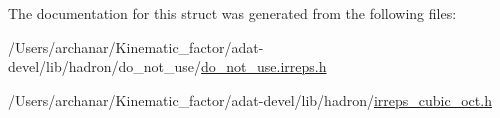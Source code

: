The documentation for this struct was generated from the following files\+:\begin{DoxyCompactItemize}
\item 
/\+Users/archanar/\+Kinematic\+\_\+factor/adat-\/devel/lib/hadron/do\+\_\+not\+\_\+use/\mbox{\hyperlink{adat-devel_2lib_2hadron_2do__not__use_2do__not__use_8irreps_8h}{do\+\_\+not\+\_\+use.\+irreps.\+h}}\item 
/\+Users/archanar/\+Kinematic\+\_\+factor/adat-\/devel/lib/hadron/\mbox{\hyperlink{adat-devel_2lib_2hadron_2irreps__cubic__oct_8h}{irreps\+\_\+cubic\+\_\+oct.\+h}}\end{DoxyCompactItemize}
